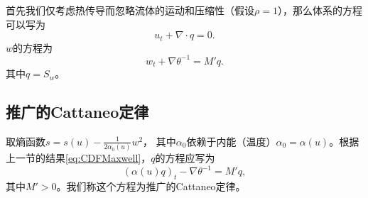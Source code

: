 首先我们仅考虑热传导而忽略流体的运动和压缩性（假设$\rho = 1$），那么体系的方程可以写为
\begin{equation*}
	 u_t  + \nabla \cdot q = 0 .	
\end{equation*}
$w$的方程为
\begin{equation*}
	 w_t + \nabla \theta^{-1} = M' q. 
\end{equation*}
其中$q = S_w$。

\subsection{推广的Cattaneo定律}

取熵函数$s = s(u)  -\frac{1}{2 \alpha_0(u)} w^2$，
其中$\alpha_0$依赖于内能（温度）$\alpha_0=\alpha(u)$。根据上一节的结果\eqref{eq:CDFMaxwell}，$q$的方程应写为
\begin{equation*}
({\alpha(u)}{q})_t-\nabla \theta^{-1}= M'{q},
\end{equation*}
其中$M'>0$。我们称这个方程为推广的Cattaneo定律。

